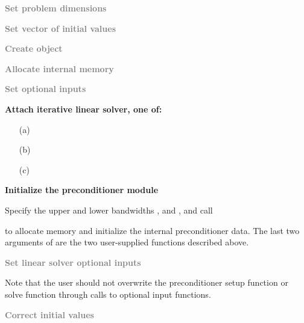 {\begin{Steps}
\item
  \textcolor{gray}{\bf Set problem dimensions}

\item
  \textcolor{gray}{\bf Set vector of initial values}
 
\item
  \textcolor{gray}{\bf Create {\ida} object}

\item
  \textcolor{gray}{\bf Allocate internal memory}

\item
  \textcolor{gray}{\bf Set optional inputs}

\item \label{i:bbdpre_attach}
  {\bf Attach iterative linear solver, one of:}

  \begin{itemize}
  \item[(a) ] 
  \item[(b) ] 
  \item[(c) ] 
  \end{itemize}

\item \label{i:bbdpre_init}
  {\bf Initialize the {\idabbdpre} preconditioner module}

  Specify the upper and lower bandwidths ,  and
  ,  and call 


  to allocate memory and initialize the internal preconditioner data.
  The last two arguments of  are the two user-supplied 
  functions described above.

\item
  \textcolor{gray}{\bf Set linear solver optional inputs}

  Note that the user should not overwrite the preconditioner setup function
  or solve function through calls to {\idaspils} optional input functions.

\item
  \textcolor{gray}{\bf Correct initial values}


\end{Steps}}
